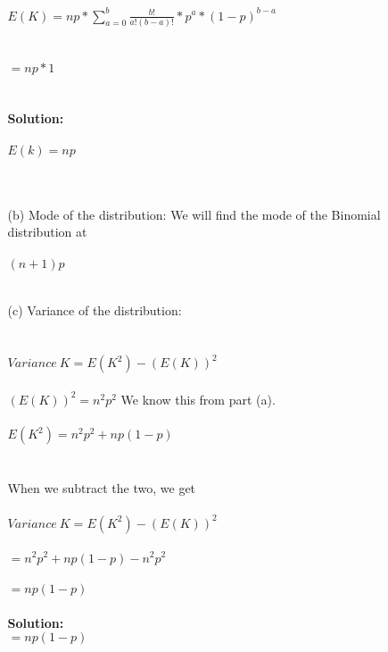 \documentclass[ruled]{article}
\begin{document}
\begin{itemize}
\begin{itemize}
{\Large $E(K) = np * \sum\limits_{a=0}^b \frac{b!}{a! (b - a)!} * p^a * (1-p)^{b - a}$   } \\ \\ \\

{\Large $ = np * 1$   } \\ \\ \\
\textbf{Solution: }\\ \\
{\Large $ E(k) = np$} \\ \\ \\
\item[(b)]  Mode of the distribution:  We will find the mode of the Binomial distribution at \\ \\  {\Large $(n+1)p$ } \\ \\

\item[(c)]  Variance of the distribution:  \\ \\ \\ 
$Variance\ K = E(K^2) - (E(K))^2$
\\ \\ 
$(E(K))^2 = n^2 p^2$       We know this from part (a).
\\ 
\\
$E(K^2) = n^2 p^2 + np(1-p) $
\\ \\ \\
When we subtract the two, we get \\ \\
$Variance\ K = E(K^2) - (E(K))^2$ \\ \\
$ = n^2 p^2 + np(1-p) - n^2 p^2$ \\ \\
{\Large $ = np(1-p)$}\\ \\

\textbf{Solution: } \\ 
{\Large $ = np(1-p)$}\\ \\
\end{itemize}
\end{itemize}
\end{document}
